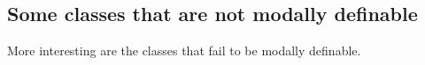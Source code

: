 







\subsection{Some classes that are not modally definable}
More interesting are the classes that fail to be modally definable.


